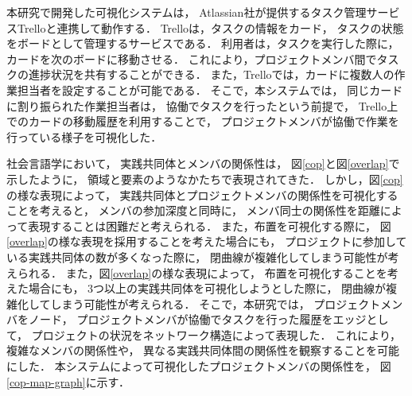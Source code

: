 

本研究で開発した可視化システムは，
Atlassian社が提供するタスク管理サービスTrello\cite{trello}と連携して動作する．
Trelloは，タスクの情報をカード，
タスクの状態をボードとして管理するサービスである．
利用者は，タスクを実行した際に，
カードを次のボードに移動させる．
これにより，プロジェクトメンバ間でタスクの進捗状況を共有することができる．
また，Trelloでは，カードに複数人の作業担当者を設定することが可能である．
そこで，本システムでは，
同じカードに割り振られた作業担当者は，
協働でタスクを行ったという前提で，
Trello上でのカードの移動履歴を利用することで，
プロジェクトメンバが協働で作業を行っている様子を可視化した．

社会言語学において，
実践共同体とメンバの関係性は，
図\ref{cop}と図\ref{overlap}で示したように，
領域と要素のようなかたちで表現されてきた．
しかし，図\ref{cop}の様な表現によって，
実践共同体とプロジェクトメンバの関係性を可視化することを考えると，
メンバの参加深度と同時に，
メンバ同士の関係性を距離によって表現することは困難だと考えられる．
また，布置を可視化する際に，
図\ref{overlap}の様な表現を採用することを考えた場合にも，
プロジェクトに参加している実践共同体の数が多くなった際に，
閉曲線が複雑化してしまう可能性が考えられる．
また，図\ref{overlap}の様な表現によって，
布置を可視化することを考えた場合にも，
3つ以上の実践共同体を可視化しようとした際に，
閉曲線が複雑化してしまう可能性が考えられる．
そこで，本研究では，
プロジェクトメンバをノード，
プロジェクトメンバが協働でタスクを行った履歴をエッジとして，
プロジェクトの状況をネットワーク構造によって表現した．
これにより，複雑なメンバの関係性や，
異なる実践共同体間の関係性を観察することを可能にした．
本システムによって可視化したプロジェクトメンバの関係性を，
図\ref{cop-map-graph}に示す．

